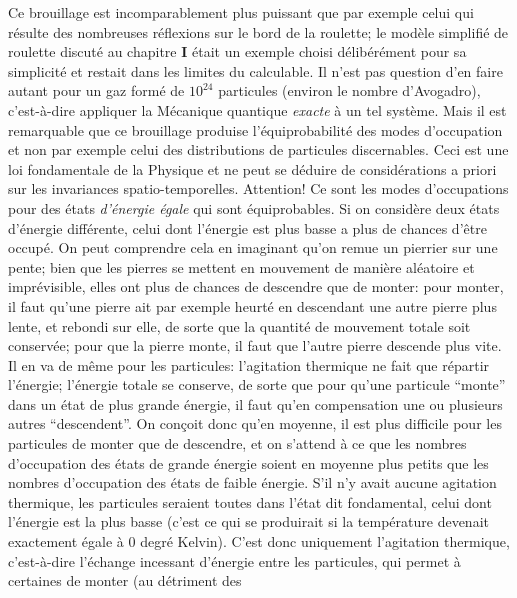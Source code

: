 Ce brouillage est incomparablement plus puissant que par exemple celui 
qui r\'esulte des nombreuses r\'eflexions sur le bord de la roulette;  le 
mod\`ele simplifi\'e  de roulette discut\'e au chapitre {\bf I} \'etait un 
exemple choisi d\'elib\'er\'ement pour sa simplicit\'e et restait dans 
les limites du calculable. Il n'est pas question d'en faire autant pour un 
gaz form\'e de $10^{24}$ particules (environ le nombre d'Avogadro), 
c'est-\`a-dire appliquer la M\'ecanique quantique {\it exacte} \`a un   
tel syst\`eme.  Mais il est remarquable que ce brouillage produise 
l'\'equiprobabilit\'e des modes d'occupation et non par exemple celui des 
distributions de particules discernables.  Ceci est une loi fondamentale 
de la Physique et ne peut se d\'eduire de consid\'erations a priori sur 
les invariances spatio-temporelles. 
\medskip 
Attention!  Ce sont les modes d'occupations pour des \'etats {\it  
d'\'energie \'egale} qui sont \'equiprobables.  Si on consid\`ere deux 
\'etats  d'\'energie diff\'erente,  celui dont l'\'energie est plus basse a 
plus de chances d'\^etre occup\'e. On peut comprendre cela en imaginant 
qu'on remue un pierrier  sur une pente; bien que les pierres se mettent en 
mouvement de mani\`ere al\'eatoire et impr\'evisible, elles ont plus de 
chances de descendre que de monter: pour monter, il faut qu'une pierre  
ait par exemple heurt\'e  en descendant une autre pierre plus lente, et 
rebondi sur elle, de sorte que la quantit\'e de mouvement totale soit 
conserv\'ee; pour que la pierre monte, il faut que l'autre pierre descende 
plus vite. Il en va de m\^eme pour les particules: l'agitation thermique ne 
fait que r\'epartir l'\'energie; l'\'energie totale se conserve, de sorte que 
pour qu'une particule ``monte'' dans un \'etat de plus grande \'energie, il 
faut qu'en compensation une ou plusieurs autres ``descendent''. On con\c 
coit donc qu'en moyenne, il est plus difficile pour les particules de 
monter que de descendre, et on s'attend \`a ce  que les nombres 
d'occupation des \'etats de grande \'energie soient en moyenne plus 
petits que les nombres d'occupation des \'etats de faible \'energie.  
\medskip 
S'il n'y avait aucune agitation thermique, les particules seraient toutes 
dans l'\'etat dit fondamental, celui dont l'\'energie est la plus basse  
(c'est ce qui se produirait si la temp\'erature devenait exactement 
\'egale \`a $0$ degr\'e Kelvin). C'est donc uniquement l'agitation 
thermique, c'est-\`a-dire l'\'echange incessant d'\'energie entre les 
particules, qui permet \`a certaines de monter (au d\'etriment des 
